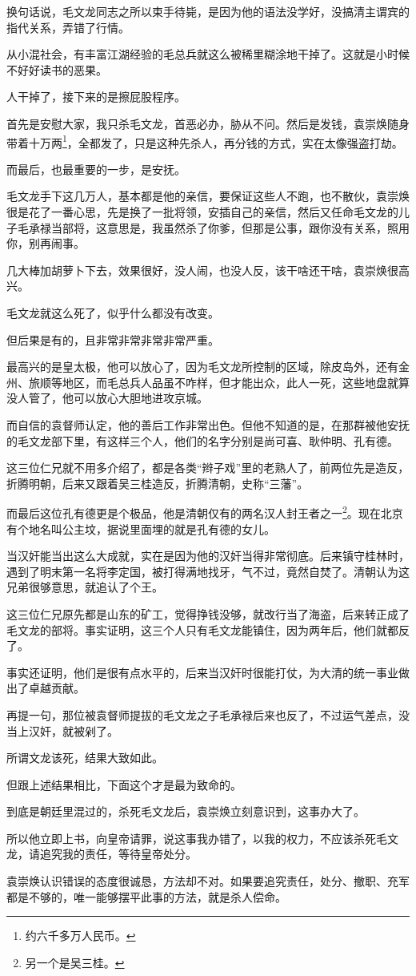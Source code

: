 \begin{multicols}{\theparacolNo}
换句话说，毛文龙同志之所以束手待毙，是因为他的语法没学好，没搞清主谓宾的指代关系，弄错了行情。

从小混社会，有丰富江湖经验的毛总兵就这么被稀里糊涂地干掉了。这就是小时候不好好读书的恶果。

人干掉了，接下来的是擦屁股程序。

首先是安慰大家，我只杀毛文龙，首恶必办，胁从不问。然后是发钱，袁崇焕随身带着十万两\footnote{约六千多万人民币。}，全都发了，只是这种先杀人，再分钱的方式，实在太像强盗打劫。

而最后，也最重要的一步，是安抚。

毛文龙手下这几万人，基本都是他的亲信，要保证这些人不跑，也不散伙，袁崇焕很是花了一番心思，先是换了一批将领，安插自己的亲信，然后又任命毛文龙的儿子毛承禄当部将，这意思是，我虽然杀了你爹，但那是公事，跟你没有关系，照用你，别再闹事。

几大棒加胡萝卜下去，效果很好，没人闹，也没人反，该干啥还干啥，袁崇焕很高兴。

毛文龙就这么死了，似乎什么都没有改变。

但后果是有的，且非常非常非常非常严重。

最高兴的是皇太极，他可以放心了，因为毛文龙所控制的区域，除皮岛外，还有金州、旅顺等地区，而毛总兵人品虽不咋样，但才能出众，此人一死，这些地盘就算没人管了，他可以放心大胆地进攻京城。

而自信的袁督师认定，他的善后工作非常出色。但他不知道的是，在那群被他安抚的毛文龙部下里，有这样三个人，他们的名字分别是尚可喜、耿仲明、孔有德。

这三位仁兄就不用多介绍了，都是各类“辫子戏”里的老熟人了，前两位先是造反，折腾明朝，后来又跟着吴三桂造反，折腾清朝，史称“三藩”。

而最后这位孔有德更是个极品，他是清朝仅有的两名汉人封王者之一\footnote{另一个是吴三桂。}。现在北京有个地名叫公主坟，据说里面埋的就是孔有德的女儿。

当汉奸能当出这么大成就，实在是因为他的汉奸当得非常彻底。后来镇守桂林时，遇到了明末第一名将李定国，被打得满地找牙，气不过，竟然自焚了。清朝认为这兄弟很够意思，就追认了个王。

这三位仁兄原先都是山东的矿工，觉得挣钱没够，就改行当了海盗，后来转正成了毛文龙的部将。事实证明，这三个人只有毛文龙能镇住，因为两年后，他们就都反了。

事实还证明，他们是很有点水平的，后来当汉奸时很能打仗，为大清的统一事业做出了卓越贡献。

再提一句，那位被袁督师提拔的毛文龙之子毛承禄后来也反了，不过运气差点，没当上汉奸，就被剁了。

所谓文龙该死，结果大致如此。

但跟上述结果相比，下面这个才是最为致命的。

到底是朝廷里混过的，杀死毛文龙后，袁崇焕立刻意识到，这事办大了。

所以他立即上书，向皇帝请罪，说这事我办错了，以我的权力，不应该杀死毛文龙，请追究我的责任，等待皇帝处分。

袁崇焕认识错误的态度很诚恳，方法却不对。如果要追究责任，处分、撤职、充军都是不够的，唯一能够摆平此事的方法，就是杀人偿命。
\ifnum{}
	\end{multicols}
\fi
\newpage
